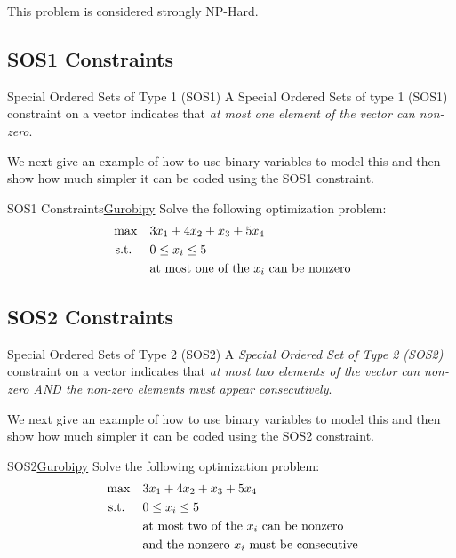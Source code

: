 This problem is considered strongly NP-Hard.

\subsection{SOS1 Constraints}
\begin{definition}{Special Ordered Sets of Type 1 (SOS1)}
A Special Ordered Sets of type 1 (SOS1) constraint on a vector indicates that \emph{at most one element of the vector can non-zero}.
\end{definition}
We next give an example of how to use binary variables to model this and then show how much simpler it can be coded using the SOS1 constraint.

\begin{examplewithcode}{SOS1 Constraints}{\href{https://github.com/open-optimization/open-optimization-or-examples/blob/master/nonlinear-programming/Gurobi-SOS-Examples.ipynb}{Gurobipy}}
\label{example:sos1}
Solve the following optimization problem: \[\begin{aligned}
\max \quad & 3x_1 + 4x_2 + x_3 + 5x_4 \\
\mbox{ s.t. } \quad  & 0 \le x_i \le 5 \\
& \mbox{at most one of the $x_i$ can be nonzero}
\end{aligned}\]
\end{examplewithcode}
\subsection{SOS2 Constraints}
\begin{definition}{Special Ordered Sets of Type 2 (SOS2)}{}
A \emph{Special Ordered Set of Type 2 (SOS2)} constraint on a vector indicates that \emph{at most two elements of the vector can non-zero AND the non-zero elements must appear consecutively}.
\end{definition}
We next give an example of how to use binary variables to model this and then show how much simpler it can be coded using the SOS2 constraint.
\begin{examplewithcode}{SOS2}{\href{https://github.com/open-optimization/open-optimization-or-examples/blob/master/nonlinear-programming/Gurobi-SOS-Examples.ipynb}{Gurobipy}}
\label{example:SOS2}
Solve the following optimization problem: \[\begin{aligned}
\max \quad & 3x_1 + 4x_2 + x_3 + 5x_4 \\
\mbox{ s.t. } \quad  & 0 \le x_i \le 5 \\
& \mbox{at most two of the $x_i$ can be nonzero} \\
& \mbox{and the nonzero $x_i$ must be consecutive}
\end{aligned}\]
\end{examplewithcode}

